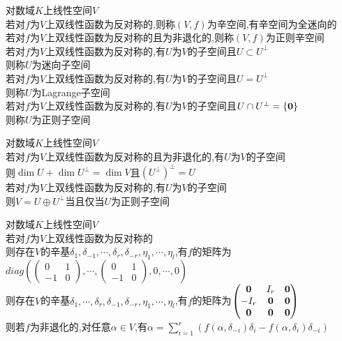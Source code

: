 \begin{dingyi}
对数域$K$上线性空间$V$\\
若对$f$为$V$上双线性函数为反对称的,则称$(V,f)$为辛空间,有辛空间为全迷向的\\
若对$f$为$V$上双线性函数为反对称的且为非退化的,则称$(V,f)$为正则辛空间\\
若对$f$为$V$上双线性函数为反对称的,有$U$为$V$的子空间且$U\subset U^{\perp}$\\
则称$U$为迷向子空间\\
若对$f$为$V$上双线性函数为反对称的,有$U$为$V$的子空间且$U=U^{\perp}$\\
则称$U$为Lagrange子空间\\
若对$f$为$V$上双线性函数为反对称的,有$U$为$V$的子空间且$U\cap U^{\perp}=\{\bf0\}$\\
则称$U$为正则子空间
\end{dingyi}

\begin{dingli}
对数域$K$上线性空间$V$\\
若对$f$为$V$上双线性函数为反对称的且为非退化的,有$U$为$V$的子空间\\
则$\dim U+\dim U^{\perp}=\dim V$且$(U^{\perp})^{\perp}=U$\\
若对$f$为$V$上双线性函数为反对称的,有$U$为$V$的子空间\\
则$V=U\oplus U^{\perp}$当且仅当$U$为正则子空间
\end{dingli}

\begin{dingli}
对数域$K$上线性空间$V$\\
若对$f$为$V$上双线性函数为反对称的\\
则存在$V$的辛基$\delta_1,\delta_{-1},\cdots,\delta_{r},\delta_{-r},\eta_1,\cdots,\eta_l$,有$f$的矩阵为$diag(\begin{pmatrix}0&1\\-1&0\end{pmatrix},\cdots,\begin{pmatrix}0&1\\-1&0\end{pmatrix},0,\cdots,0)$\\
则存在$V$的辛基$\delta_1,\cdots,\delta_{r},\delta_{-1},\delta_{-r},\eta_1,\cdots,\eta_l$,有$f$的矩阵为$\begin{pmatrix}\bf0&I_r&\bf0\\ -I_r&\bf0&\bf0\\ \bf0&\bf0&\bf0\end{pmatrix}$\\
则若$f$为非退化的,对任意$\alpha\in V$,有$\alpha=\sum\limits_{i=1}^{r}(f(\alpha,\delta_{-i})\delta_{i}-f(\alpha,\delta_{i})\delta_{-i})$
\end{dingli}

